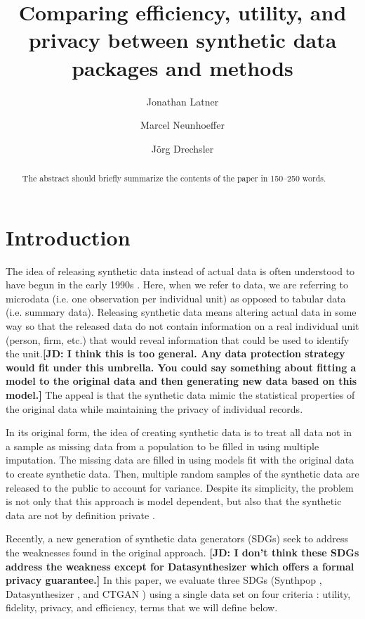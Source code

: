 \documentclass[runningheads]{llncs}
\title{Comparing efficiency, utility, and privacy between synthetic data packages and methods}
\author{Jonathan Latner\inst{1 (\text{\Letter})\orcidlink{0000-0002-1825-0097}} \and
Marcel Neunhoeffer\inst{1 \orcidlink{0000-0002-9137-5785}}  \and
Jörg Drechsler\inst{1 }}
\institute{Institute for Employment Research, Nuremberg, Germany
\email{\{jonathan.latner, marcel.neunhoeffer,joerg.drechsler\}@iab.de}}
\newcommand{\jd}[1]{\scriptsize {\bf \color{red}[JD: #1]}\normalsize}
\begin{document}
\maketitle              %

\begin{abstract}
The abstract should briefly summarize the contents of the paper in
150--250 words.

\end{abstract}


\clearpage

\section{Introduction}

The idea of releasing synthetic data instead of actual data is often understood to have begun in the early 1990s \cite{rubin1993statistical,little1993statistical}.  Here, when we refer to data, we are referring to microdata (i.e. one observation per individual unit) as opposed to tabular data (i.e. summary data).  Releasing synthetic data means altering actual data in some way so that the released data do not contain information on a real individual unit (person, firm, etc.) that would reveal information that could be used to identify the unit.\jd{I think this is too general. Any data protection strategy would fit under this umbrella. You could say something about fitting a model to the original data and then generating new data based on this model.}  The appeal is that the synthetic data mimic the statistical properties of the original data while maintaining the privacy of individual records.

In its original form, the idea of creating synthetic data is to treat all data not in a sample as missing data from a population to be filled in using multiple imputation.  The missing data are filled in using models fit with the original data to create synthetic data.  Then, multiple random samples of the synthetic data are released to the public to account for variance.  Despite its simplicity, the problem is not only that this approach is model dependent, but also that the synthetic data are not by definition private \cite{reiter2009estimating}.  

Recently, a new generation of synthetic data generators (SDGs) seek to address the weaknesses found in the original approach. \jd{I don't think these SDGs address the weakness except for Datasynthesizer which offers a formal privacy guarantee.}  In this paper, we evaluate three SDGs (Synthpop \cite{nowok2016synthpop}, Datasynthesizer \cite{ping2017datasynthesizer}, and CTGAN \cite{ctgan}) using a single data set on four criteria \cite{jordon2022synthetic}: utility, fidelity, privacy, and efficiency, terms that we will define below.  
\end{document}
